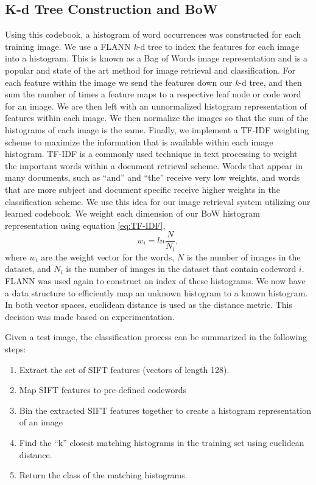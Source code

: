 \subsection{K-d Tree Construction and BoW}
Using this codebook, a histogram of word occurrences was constructed for each training image. 
We use a FLANN \emph{k}-d tree to index the features for each image into a histogram.
This is known as a Bag of Words image representation and is a popular and state of the art method for image retrieval and classification.
For each feature within the image we send the features down our \emph{k}-d tree, and then sum the number of times a feature maps to a respective leaf node or code word for an image.
We are then left with an unnormalized histogram representation of features within each image.
We then normalize the images so that the sum of the histograms of each image is the same.
Finally, we implement a TF-IDF weighting scheme to maximize the information that is available within each image histogram.
TF-IDF is a commonly used technique in text processing to weight the important words within a document retrieval scheme.  
Words that appear in many documents, such as ``and'' and ``the'' receive very low weights, and words that are more subject and document specific receive higher weights in the classification scheme.
We use this idea for our image retrieval system utilizing our learned codebook.
We weight each dimension of our BoW histogram representation using equation \ref{eq:TF-IDF},
\begin{equation}
\label{eq:TF-IDF}
w_{i} = ln\frac{N}{N_{i}},
\end{equation}
where $w_i$ are the weight vector for the words, $N$ is the number of images in the dataset, and $N_i$ is the number of images in the dataset that contain codeword $i$.
FLANN was used again to construct an index of these histograms. 
We now have a data structure to efficiently map an unknown histogram to a known histogram.
In both vector spaces, euclidean distance is used as the distance metric. 
This decision was made based on experimentation.

Given a test image, the classification process can be summarized in the following steps:
\begin{enumerate}
\item Extract the set of SIFT features (vectors of length 128).

\item Map SIFT features to pre-defined codewords

\item Bin the extracted SIFT features together to create a histogram representation of an image

\item Find the ``k'' closest matching histograms in the training set using euclidean distance.

\item Return the class of the matching histograms.
\end{enumerate}




